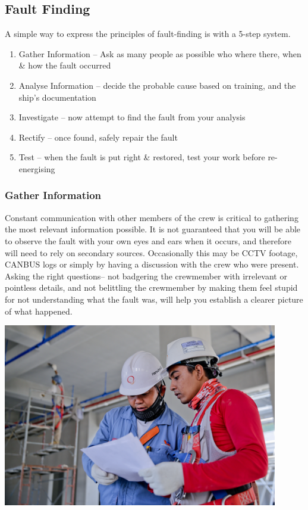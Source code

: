 \documentclass[11pt,a4paper]{article}
\begin{document}
\subsection{Fault Finding}
A simple way to express the principles of fault-finding is with a 5-step system.
\begin{enumerate}
\item Gather Information – Ask as many people as possible who where there,  when \& how the fault occurred
\item Analyse Information – decide the probable cause based on training, and the ship's documentation
\item Investigate – now attempt to find the fault from your analysis
\item Rectify – once found, safely repair the fault
\item Test – when the fault is put right \& restored, test your work before re-energising
\end{enumerate}
\subsubsection{Gather Information}
Constant communication with other members of the crew is critical to gathering the most relevant information possible. It is not guaranteed that you will be able to observe the fault with your own eyes and ears when it occurs, and therefore will need to rely on secondary sources. Occasionally this may be CCTV footage, CANBUS logs or simply by having a discussion with the crew who were present. Asking the right questions-- not badgering the crewmember with irrelevant or pointless details, and not belittling the crewmember by making them feel stupid for not understanding what the fault was, will help you establish a clearer picture of what happened.
\begin{center}
  \includegraphics[width=12cm]{menchat}
\end{center}
\end{document}
